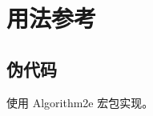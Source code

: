 \documentclass[zihao=-4]{ctexart}
\begin{document}
\section{}

\section{用法参考}
	\subsection{伪代码}
		使用 Algorithm2e 宏包实现。
	
	
	
	
\end{document}
